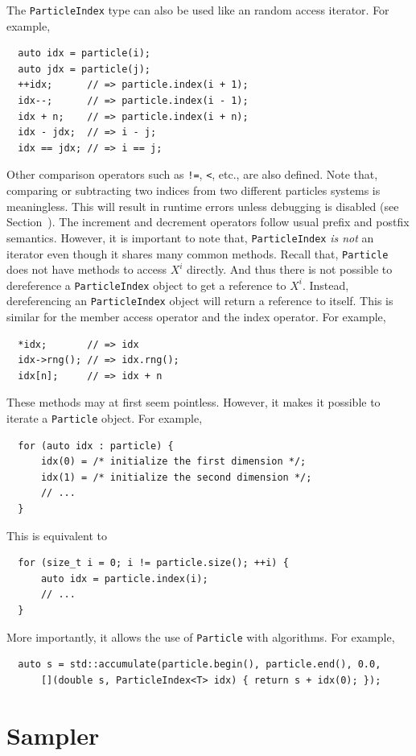 The \verb|ParticleIndex| type can also be used like an random access iterator.
For example,
\begin{Verbatim}
  auto idx = particle(i);
  auto jdx = particle(j);
  ++idx;      // => particle.index(i + 1);
  idx--;      // => particle.index(i - 1);
  idx + n;    // => particle.index(i + n);
  idx - jdx;  // => i - j;
  idx == jdx; // => i == j;
\end{Verbatim}
Other comparison operators such as \verb|!=|, \verb|<|, etc., are also
defined. Note that, comparing or subtracting two indices from two different
particles systems is meaningless. This will result in runtime errors unless
debugging is disabled (see Section~). The increment
and decrement operators follow usual \cpp prefix and postfix semantics.
However, it is important to note that, \verb|ParticleIndex| \emph{is not} an
iterator even though it shares many common methods. Recall that,
\verb|Particle| does not have methods to access $X^i$ directly. And thus there
is not possible to dereference a \verb|ParticleIndex| object to get a reference
to $X^i$. Instead, dereferencing an \verb|ParticleIndex| object will return a
reference to itself. This is similar for the member access operator and the
index operator. For example,
\begin{Verbatim}
  *idx;       // => idx
  idx->rng(); // => idx.rng();
  idx[n];     // => idx + n
\end{Verbatim}
These methods may at first seem pointless. However, it makes it possible to
iterate a \verb|Particle| object. For example,
\begin{Verbatim}
  for (auto idx : particle) {
      idx(0) = /* initialize the first dimension */;
      idx(1) = /* initialize the second dimension */;
      // ...
  }
\end{Verbatim}
This is equivalent to
\begin{Verbatim}
  for (size_t i = 0; i != particle.size(); ++i) {
      auto idx = particle.index(i);
      // ...
  }
\end{Verbatim}
More importantly, it allows the use of \verb|Particle| with algorithms. For
example,
\begin{Verbatim}
  auto s = std::accumulate(particle.begin(), particle.end(), 0.0,
      [](double s, ParticleIndex<T> idx) { return s + idx(0); });
\end{Verbatim}

\section{Sampler}
\label{sec:Sampler}

